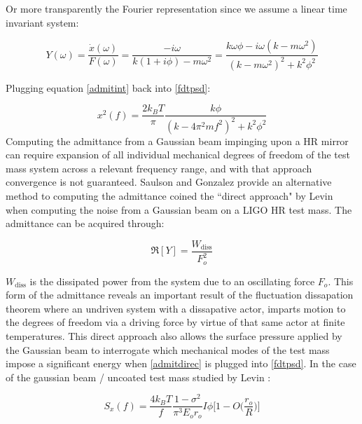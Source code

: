 \noindent Or more transparently the Fourier representation since we assume a linear time invariant system:

\begin{equation}\label{admitint}
Y(\omega) = \frac{\dot{x}(\omega)}{F(\omega)} = \frac{-i\omega}{k(1+i\phi) - m\omega^2} = \frac{k \omega \phi - i \omega (k - m \omega^2)}{(k-m\omega^2)^2 +k^2 \phi^2}
\end{equation}

\noindent Plugging equation \ref{admitint} back into \ref{fdtpsd}:

\begin{equation}
x^2 (f)  = \frac{2k_B T}{\pi}\frac{k\phi}{(k-4\pi^2 m f^2)^2 + k^2 \phi^2}
\end{equation}
Computing the admittance from a Gaussian beam impinging upon a HR mirror can require expansion of all individual mechanical degrees of freedom of the test mass system across a relevant frequency range, and with that approach convergence is not guaranteed. Saulson and Gonzalez provide an alternative method to computing the admittance coined the ``direct approach" by Levin when computing the noise from a Gaussian beam on a LIGO HR test mass. The admittance can be acquired through:

\begin{equation}\label{admitdirec}
\Re[Y] = \frac{W_\mathrm{diss}}{F_o^2}
\end{equation}

\noindent $W_\mathrm{diss}$ is the dissipated power from the system due to an oscillating force $F_o$. This form of the admittance reveals an important result of the fluctuation dissapation theorem where an undriven system with a dissapative actor, imparts motion to the degrees of freedom via a driving force by virtue of that same actor at finite temperatures. This direct approach also allows the surface pressure applied by the Gaussian beam to interrogate which mechanical modes of the test mass impose a significant energy when \ref{admitdirec} is plugged into \ref{fdtpsd}. In the case of the gaussian beam / uncoated test mass studied by Levin \cite{levin:1998}:

\begin{equation}
S_x(f) = \frac{4 k_B T}{f} \frac{1-\sigma^2}{\pi^3 E_o r_o} I\phi \bigg[1- O\bigg( \frac{r_o}{R} \bigg)\bigg]
\end{equation}


